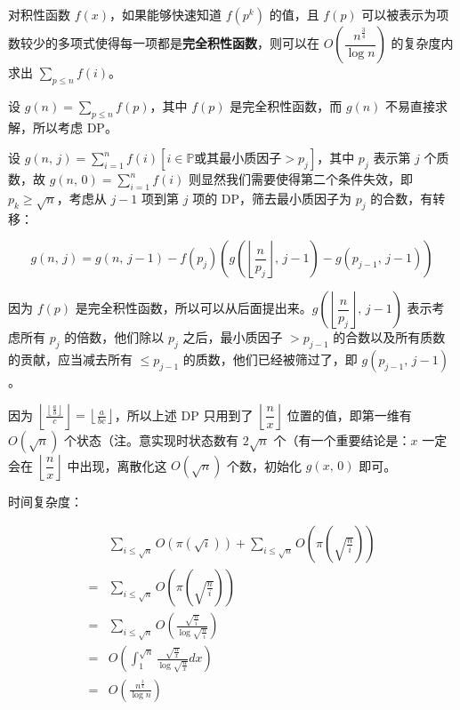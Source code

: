 对积性函数 $f(x)$，如果能够快速知道 $f(p^k)$ 的值，且 $f(p)$ 可以被表示为项数较少的多项式使得每一项都是\textbf{完全积性函数}，则可以在 $O\left(\dfrac{n^{\frac{3}{4}}}{\log{n}}\right)$ 的复杂度内求出 $\sum\limits_{p \le n} f(i)$。 

设 $g(n) = \sum\limits_{p \le n} f(p)$，其中 $f(p)$ 是完全积性函数，而 $g(n)$ 不易直接求解，所以考虑 DP。

设 $g(n, \, j) = \sum\limits_{i = 1}^{n}f(i)[i \in \mathbb{P}\text{或其最小质因子} > p_j]$，其中 $p_j$ 表示第 $j$ 个质数，故 $g(n, \, 0) = \sum\limits_{i = 1}^{n} f(i)$ 则显然我们需要使得第二个条件失效，即 $p_k \ge \sqrt{n}$，考虑从 $j - 1$ 项到第 $j$ 项的 DP，筛去最小质因子为 $p_j$ 的合数，有转移：

$$g(n, \, j) = g(n, \, j - 1) - f(p_j)\left(g\left(\left\lfloor\frac{n}{p_j}\right\rfloor, \, j - 1\right) - g(p_{j - 1}, \, j - 1)\right)$$

因为 $f(p)$ 是完全积性函数，所以可以从后面提出来。$g\left(\left\lfloor\dfrac{n}{p_j}\right\rfloor, \, j - 1\right)$ 表示考虑所有 $p_j$ 的倍数，他们除以 $p_j$ 之后，最小质因子 $> p_{j - 1}$ 的合数以及所有质数的贡献，应当减去所有 $\le p_{j - 1}$ 的质数，他们已经被筛过了，即 $g(p_{j - 1}, \, j - 1)$。

因为 $\left\lfloor\frac{\left\lfloor\frac{a}{b}\right\rfloor}{c}\right\rfloor = \left\lfloor\frac{a}{bc}\right\rfloor$，所以上述 DP 只用到了 $\left\lfloor\dfrac{n}{x}\right\rfloor$ 位置的值，即第一维有 $O(\sqrt{n})$ 个状态（注。意实现时状态数有 $2\sqrt{n}$ 个（有一个重要结论是：$x$ 一定会在 $\left\lfloor\dfrac{n}{x}\right\rfloor$ 中出现，离散化这 $O(\sqrt{n})$ 个数，初始化 $g(x, \, 0)$ 即可。

时间复杂度：

$$\begin{aligned}&\sum_{i \le \sqrt{n}}O\left(\pi\left(\sqrt{i}\right)\right) + \sum_{i \le \sqrt{n}}O\left(\pi\left(\sqrt{\frac{n}{i}}\right)\right) \\ =&\sum_{i \le \sqrt{n}}O\left(\pi\left(\sqrt{\frac{n}{i}}\right)\right) \\ =&\sum_{i \le \sqrt{n}}O\left(\frac{\sqrt{\frac{n}{i}}}{\log{\sqrt{\frac{n}{i}}}}\right) \\ =&O\left(\int_{1}^{\sqrt{n}}\frac{\sqrt{\frac{n}{x}}}{\log{\sqrt{\frac{n}{x}}}}dx\right) \\ =&O\left(\frac{n^{\frac{3}{4}}}{\log{n}}\right) \end{aligned}$$

